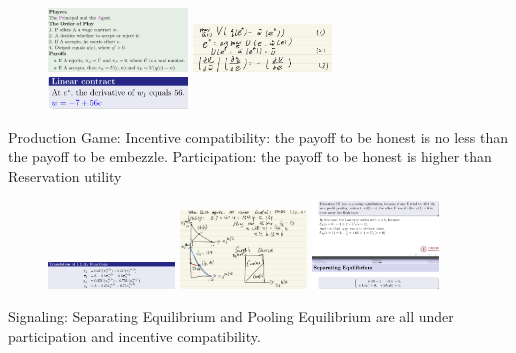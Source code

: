 \documentclass{article}
\begin{document}
\begin{figure}[H]
    \includegraphics[width=0.33\textwidth]{production2.png}
    \includegraphics[width=0.33\textwidth]{production.png}
    \includegraphics[width=0.33\textwidth]{production3.png}
\end{figure}
Production Game: Incentive compatibility: the payoff to be honest is no less than the payoff to be embezzle. Participation: the payoff to be honest is higher than Reservation utility\\ 
\begin{figure}[H]
    \includegraphics[width=0.3\textwidth]{insurance.png}
    \includegraphics[width=0.3\textwidth]{insurance2.png}
    \includegraphics[width=0.3\textwidth]{signal.png}
\end{figure}
Signaling: Separating Equilibrium and Pooling Equilibrium are all under participation and incentive compatibility.\\
\end{document}
